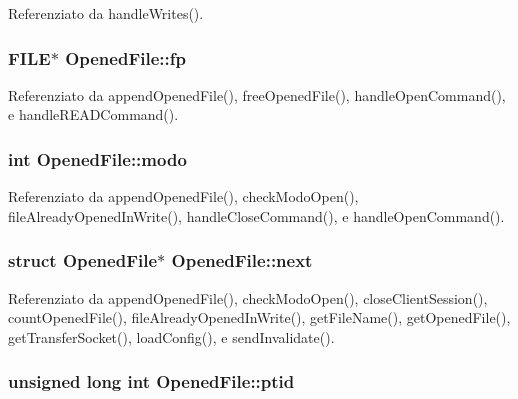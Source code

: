 Referenziato da handle\+Writes().

\subsubsection[{\texorpdfstring{fp}{fp}}]{\setlength{\rightskip}{0pt plus 5cm}F\+I\+LE$\ast$ Opened\+File\+::fp}\hypertarget{structOpenedFile_a9cdcaccacb2eb66a17c0781666c28b15}{}\label{structOpenedFile_a9cdcaccacb2eb66a17c0781666c28b15}


Referenziato da append\+Opened\+File(), free\+Opened\+File(), handle\+Open\+Command(), e handle\+R\+E\+A\+D\+Command().

\subsubsection[{\texorpdfstring{modo}{modo}}]{\setlength{\rightskip}{0pt plus 5cm}int Opened\+File\+::modo}\hypertarget{structOpenedFile_a6d9f22ff6ba81506ba9c4a60f27c4f32}{}\label{structOpenedFile_a6d9f22ff6ba81506ba9c4a60f27c4f32}


Referenziato da append\+Opened\+File(), check\+Modo\+Open(), file\+Already\+Opened\+In\+Write(), handle\+Close\+Command(), e handle\+Open\+Command().

\subsubsection[{\texorpdfstring{next}{next}}]{\setlength{\rightskip}{0pt plus 5cm}struct {\bf Opened\+File}$\ast$ Opened\+File\+::next}\hypertarget{structOpenedFile_a1d8b0791af363423c6d93a0699237718}{}\label{structOpenedFile_a1d8b0791af363423c6d93a0699237718}


Referenziato da append\+Opened\+File(), check\+Modo\+Open(), close\+Client\+Session(), count\+Opened\+File(), file\+Already\+Opened\+In\+Write(), get\+File\+Name(), get\+Opened\+File(), get\+Transfer\+Socket(), load\+Config(), e send\+Invalidate().

\subsubsection[{\texorpdfstring{ptid}{ptid}}]{\setlength{\rightskip}{0pt plus 5cm}unsigned long int Opened\+File\+::ptid}\hypertarget{structOpenedFile_a33cb5376fd14129a1635cf142c0781a6}{}\label{structOpenedFile_a33cb5376fd14129a1635cf142c0781a6}


